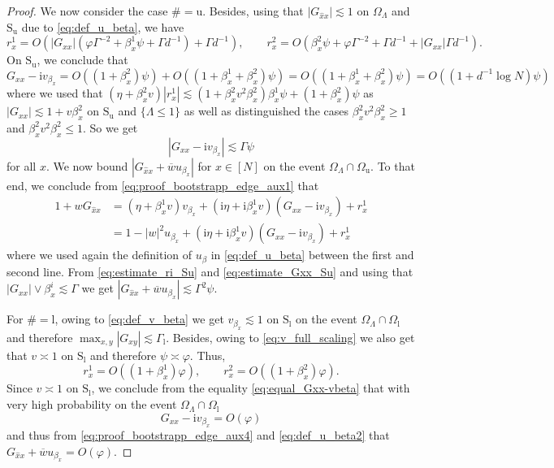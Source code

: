 \documentclass[11pt]{article}
\newcommand{\ii}{\mathrm{i}}
\newcommand{\abs}[1]{\left| #1 \right|}
\theoremstyle{plain}
\theoremstyle{remark}
\numberwithin{equation}{section}
\newcommand*\barr[1]{\overline{#1}}
\newcommand*\ubarr[1]{{\widehat{#1}}}
\begin{document}
\begin{proof}
		We now consider the case $\# = \mathrm{u}$. 
		Besides, using that $\abs{G_{\ubarr{x}x}} \lesssim 1$ on $\Omega_{\Lambda}$ and $\mathrm{S}_\mathrm{u}$ due to \eqref{eq:def_u_beta}, 
		we have 
			\begin{equation}\label{eq:estimate_ri_Su}
			r_x^1 = O(\abs{G_{xx}} (\varphi \Gamma^{-2} +  \beta^1_x \psi  + \Gamma d^{-1}) + \Gamma d^{-1} ) 
		, \qquad r_x^2= O(\beta^2_x \psi + \varphi \Gamma^{-2} + \Gamma d^{-1} + \abs{G_{xx}} \Gamma d^{-1} ).
		\end{equation}
	 On $\mathrm{S}_\mathrm{u}$, we conclude that
		\[ 
		G_{xx} - \ii v_{\beta_x} = O ( (1 + \beta_x^2 )\psi) + O( (1 + \beta_x^1 + \beta_x^2 ) \psi) = O( ( 1  + \beta_x^1 + \beta_x^2 ) \psi) = O( (1 + d^{-1} \log N)\psi ) 
		\]
		where we used that $(\eta + \beta_x^2 v) \abs{r_x^1} \lesssim (1 + \beta_x^2 v^2 \beta_x^2) \beta_x^1 \psi + (1 + \beta_x^2) \psi $ as $\abs{G_{xx}} 
		\lesssim 1 + v\beta_x^2$ on $\mathrm{S}_\mathrm{u}$ and $\{ \Lambda \leq 1\}$ as well as distinguished the cases $\beta_x^2 v^2 \beta_x^2 \geq 1$ and $\beta_x^2 v^2 \beta_x^2 \leq 1$. 
		So we get 
		\begin{equation}\label{eq:estimate_Gxx_Su}
\abs{G_{xx} - \ii v_{\beta_x}} \lesssim \Gamma \psi 		    
		\end{equation}
		for all $x$. We now bound $\abs{G_{ \ubarr{x}x} + \barr{w} u_{\beta_{x}}}$ for $x \in [N]$ on the event $\Omega_{\Lambda} \cap \Omega_{\mathrm u} $. To that end, we conclude from \eqref{eq:proof_bootstrapp_edge_aux1} that
		\begin{align*}
			1 + wG_{\ubarr{x}x} &= ( \eta + \beta_{x}^1 v) v_{\beta_x} + (\ii \eta + \ii \beta_{x}^1 v ) (G_{xx} - \ii v_{\beta_x}) + r_{x}^1\\
			&= 1 - \abs{w}^2 u_{\beta_x} + (\ii \eta + \ii \beta_{x}^1 v) (G_{xx} - \ii v_{\beta_x}) + r_{x}^1
		\end{align*}
		where we used again the definition of $u_{\beta}$ in \eqref{eq:def_u_beta} between the first and second line. From \eqref{eq:estimate_ri_Su} and \eqref{eq:estimate_Gxx_Su} and using that $|G_{xx}|\vee \beta^{i}_x \lesssim \Gamma$ we get 
		$\abs{G_{\ubarr{x}x} + \barr{w} u_{\beta_x}}\lesssim \Gamma^2 \psi$. 
		
For $\# = \mathrm{l}$, owing to \eqref{eq:def_v_beta} we get $v_{\beta_x} \lesssim 1$ on $\mathrm{S}_\mathrm{l}$ on the event $\Omega_{\Lambda} \cap \Omega_{\mathrm{l}}$ and therefore $\max_{x,y} \abs{G_{xy}} \lesssim \Gamma_{\mathrm{l}}$. Besides, owing to \cref{eq:v_full_scaling} we also get that $v \asymp 1$ on  $\mathrm{S}_\mathrm{l}$ and therefore $\psi \asymp \varphi $. Thus, 
		\[ r_x^1 = O( (1 + \beta_x^1)\varphi), \qquad r_x^2 = O( (1 + \beta_x^2) \varphi). \] 
		Since $v\asymp 1$ on $\mathrm{S}_\mathrm{l}$,  we conclude from the equality \eqref{eq:equal_Gxx-vbeta} that with very high probability on the event $\Omega_{\Lambda} \cap \Omega_{\mathrm{l}}$
		\[ G_{xx} - \ii v_{\beta_x} = O(\varphi) \] 
		and thus from \cref{eq:proof_bootstrapp_edge_aux4} and \cref{eq:def_u_beta2} that $G_{\ubarr{x}x} + \overline{w} u_{\beta_x} = O(\varphi)$. 
		

\end{proof}
\end{document}

